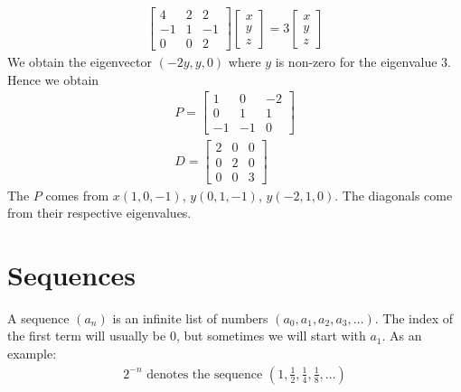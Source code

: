 \documentclass[a4paper]{article}
\theoremstyle{plain}
\theoremstyle{definition}
\newtheorem{defn}{Definition}[section]
\newtheorem{exmp}{Example}[section]
\theoremstyle{remark}
\begin{document}
\begin{tcolorbox}[colback=black!3!white,colframe=black!60!white,title=\begin{exmp}Example 1 \label{Example 1}\end{exmp}]
\begin{align*}
			\begin{bmatrix} 4 & 2 & 2 \\ -1 & 1 & -1 \\ 0 & 0 & 2 \end{bmatrix} \begin{bmatrix} x \\ y \\ z \end{bmatrix} = 3 \begin{bmatrix} x \\ y \\ z \end{bmatrix} 
		\end{align*}
		We obtain the eigenvector $(-2y,y,0)$ where $y$ is non-zero for the eigenvalue $3$. Hence we obtain
		\begin{align*}
			P = \begin{bmatrix} 1 & 0 & -2 \\ 0 & 1 & 1 \\ -1 & -1 & 0 \end{bmatrix} \\ 
			D = \begin{bmatrix} 2 & 0 & 0 \\ 0 & 2 & 0 \\ 0 & 0 & 3 \end{bmatrix} 
		\end{align*}
		The $P$ comes from $x(1,0,-1)$, $y(0,1,-1)$, $y(-2,1,0)$. The diagonals come from their respective eigenvalues.
\end{tcolorbox}
\section{Sequences}
\begin{tcolorbox}[colback=black!3!white,colframe=black!60!white,title=\begin{defn}Sequence \label{Sequence}\end{defn}]
A sequence $(a_n)$ is an infinite list of numbers $(a_0,a_1,a_2,a_3,\ldots)$. The index of the first term will usually be $0 $, but sometimes we will start with $a_1$. As an example:
\begin{align}
2^{-n} \text{ denotes the sequence } (1,\frac{1}{2},\frac{1}{4},\frac{1}{8},\ldots)
\end{align}
\end{tcolorbox}
\end{document}
